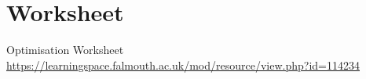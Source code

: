 \part{Worksheet}
\frame{\partpage}

\begin{frame}{Optimisation Worksheet}
	\url{https://learningspace.falmouth.ac.uk/mod/resource/view.php?id=114234}
\end{frame}